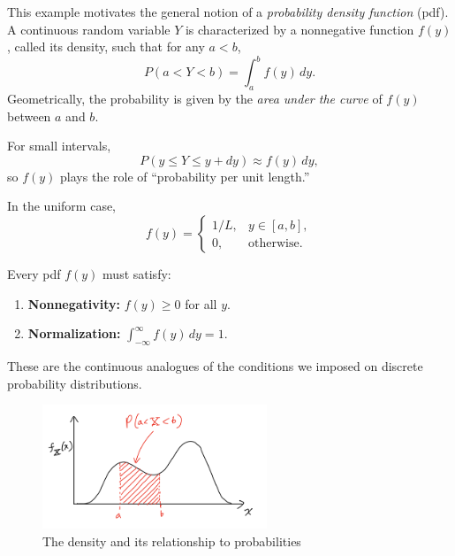 This example motivates the general notion of a \emph{probability density function} (pdf). A continuous random variable \(Y\) is characterized by a nonnegative function \(f(y)\), called its density, such that for any \(a<b\),  
\[
P(a < Y < b) = \int_a^b f(y)\,dy.
\]  
Geometrically, the probability is given by the \emph{area under the curve} of \(f(y)\) between \(a\) and \(b\).  

For small intervals,  
\[
P(y \le Y \le y+dy) \approx f(y)\,dy,
\]  
so \(f(y)\) plays the role of ``probability per unit length.''  

In the uniform case,  
\[
f(y) = 
\begin{cases}
1/L, & y \in [a,b], \\
0, & \text{otherwise}.
\end{cases}
\]  

Every pdf \(f(y)\) must satisfy:  
\begin{enumerate}
\item \textbf{Nonnegativity:} \(f(y) \ge 0\) for all \(y\).  
\item \textbf{Normalization:} \(\int_{-\infty}^{\infty} f(y)\,dy = 1\).  
\end{enumerate}

These are the continuous analogues of the conditions we imposed on discrete probability distributions.  


\begin{figure}[h]
\centering
\includegraphics[width=0.6\textwidth]{./../figures/density}
\caption{The density and its relationship to probabilities}\label{fig:density}
\end{figure}



